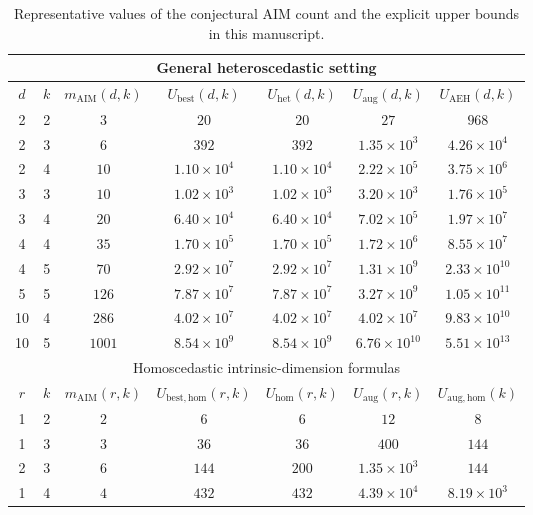 \documentclass[11pt]{article}
\theoremstyle{plain}
\theoremstyle{definition}
\theoremstyle{remark}
\numberwithin{equation}{section}
\begin{document}
\begin{table}[htbp]
\centering
\caption{Representative values of the conjectural AIM count and the explicit upper bounds in this manuscript.}
\label{tab:upper-comparison}
\scriptsize
\setlength{\tabcolsep}{4pt}
\begin{tabular}{ccccccc}
\toprule
\multicolumn{7}{c}{General heteroscedastic setting} \\
\midrule
$d$ & $k$ & $m_{\mathrm{AIM}}(d,k)$ & $U_{\mathrm{best}}(d,k)$ & $U_{\mathrm{het}}(d,k)$ & $U_{\mathrm{aug}}(d,k)$ & $U_{\mathrm{AEH}}(d,k)$ \\
\midrule
2 & 2 & $3$ & $20$ & $20$ & $27$ & $968$ \\
2 & 3 & $6$ & $392$ & $392$ & $1.35\times 10^{3}$ & $4.26\times 10^{4}$ \\
2 & 4 & $10$ & $1.10\times 10^{4}$ & $1.10\times 10^{4}$ & $2.22\times 10^{5}$ & $3.75\times 10^{6}$ \\
3 & 3 & $10$ & $1.02\times 10^{3}$ & $1.02\times 10^{3}$ & $3.20\times 10^{3}$ & $1.76\times 10^{5}$ \\
3 & 4 & $20$ & $6.40\times 10^{4}$ & $6.40\times 10^{4}$ & $7.02\times 10^{5}$ & $1.97\times 10^{7}$ \\
4 & 4 & $35$ & $1.70\times 10^{5}$ & $1.70\times 10^{5}$ & $1.72\times 10^{6}$ & $8.55\times 10^{7}$ \\
4 & 5 & $70$ & $2.92\times 10^{7}$ & $2.92\times 10^{7}$ & $1.31\times 10^{9}$ & $2.33\times 10^{10}$ \\
5 & 5 & $126$ & $7.87\times 10^{7}$ & $7.87\times 10^{7}$ & $3.27\times 10^{9}$ & $1.05\times 10^{11}$ \\
10 & 4 & $286$ & $4.02\times 10^{7}$ & $4.02\times 10^{7}$ & $4.02\times 10^{7}$ & $9.83\times 10^{10}$ \\
10 & 5 & $1001$ & $8.54\times 10^{9}$ & $8.54\times 10^{9}$ & $6.76\times 10^{10}$ & $5.51\times 10^{13}$ \\
\midrule
\multicolumn{7}{c}{Homoscedastic intrinsic-dimension formulas} \\
\midrule
$r$ & $k$ & $m_{\mathrm{AIM}}(r,k)$ & $U_{\mathrm{best,hom}}(r,k)$ & $U_{\mathrm{hom}}(r,k)$ & $U_{\mathrm{aug}}(r,k)$ & $U_{\mathrm{aug,hom}}(k)$ \\
\midrule
1 & 2 & $2$ & $6$ & $6$ & $12$ & $8$ \\
1 & 3 & $3$ & $36$ & $36$ & $400$ & $144$ \\
2 & 3 & $6$ & $144$ & $200$ & $1.35\times 10^{3}$ & $144$ \\
1 & 4 & $4$ & $432$ & $432$ & $4.39\times 10^{4}$ & $8.19\times 10^{3}$ \\

\end{tabular}
\end{table}
\end{document}

